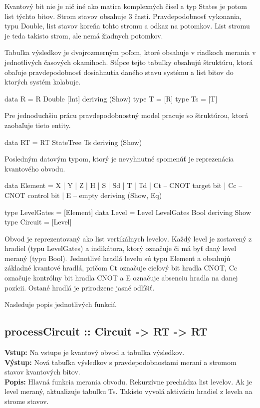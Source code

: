 Kvantový bit nie je nič iné ako matica komplexných čísel a typ States je potom
list týchto bitov. Strom stavov obsahuje 3 časti. Pravdepodobnosť vykonania,
typu Double, list stavov koreňa tohto stromu a odkaz na potomkov. List stromu
je teda takisto strom, ale nemá žiadnych potomkov.

Tabuľka výsledkov je dvojrozmerným poľom, ktoré obsahuje v riadkoch merania 
v jednotlivých časových okamihoch. Stĺpce tejto tabuľky obsahujú štruktúru, 
ktorá obaľuje pravdepodobnosť dosiahnutia daného stavu systému a list bitov 
do ktorých systém kolabuje.
\begin{code}
data R = R Double [Int]
    deriving (Show)
type T = [R]
type Ts = [T]
\end{code}

Pre jednoduchšiu prácu pravdepodobnostný model pracuje so štruktúrou, ktorá 
zaobaľuje tieto entity.
\begin{code}
data RT = RT StateTree Ts
    deriving (Show)
\end{code}

Posledným datovým typom, ktorý je nevyhnutné spomenúť je reprezenácia kvantového
obvodu.
\begin{code}
data Element = X
    | Y
    | Z
    | H
    | S
    | Sd
    | T
    | Td
    | Ct   -- CNOT target bit
    | Cc  -- CNOT control bit
    | E   -- empty
    deriving (Show, Eq)

type LevelGates = [Element]
data Level = Level LevelGates Bool deriving Show
type Circuit = [Level]
\end{code}

Obvod je reprezentovaný ako list vertikálnych levelov. Každý level je zostavený
z hradiel (typu LevelGates) a indikátora, ktorý označuje či má byť daný level
meraný (typu Bool). Jednotlivé hradlá levelu sú typu Element a obsahujú
základné kvantové hradlá, pričom Ct označuje cieľový bit hradla CNOT, Cc 
označuje kontrólny bit hradla CNOT a E označuje absenciu hradla na danej
pozícii. Ostané hradlá je prirodzene jasné odlíšiť.

Nasleduje popis jednotlivých funkcií.

\subsection*{processCircuit :: Circuit -> RT -> RT }
\textbf{Vstup:} Na vstupe je kvantový obvod a tabuľka výsledkov.\\
\textbf{Výstup:} Nová tabuľka výsledkov s pravdepodobnosťami meraní a stromom
stavov kvantových bitov. \\
\textbf{Popis:}
Hlavná funkcia merania obvodu. Rekurzívne prechádza list levelov. Ak je 
level meraný, aktualizuje tabuľku Ts. Takisto vyvolá aktiváciu hradiel z 
levela na strome stavov.

